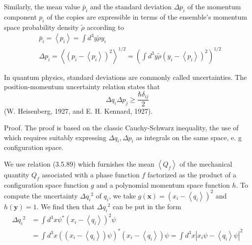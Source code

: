 \documentclass{article}
\begin{document}
Similarly, the mean value $\bar{p}_{i}$ and the standard deviation $\Delta p_{i}$ of the momentum component $p_{i}$ of the copies are expressible in terms of the ensemble's momentum space probability density $\tilde{\rho}$ according to
$$
\begin{align*}
& \bar{p}_{i}=\left\langle p_{i}\right\rangle=\int d^{3} y \tilde{\rho} y_{i}  \tag{3.10.3}\\
& \Delta p_{i}=\left\langle\left(p_{i}-\left\langle p_{i}\right\rangle\right)^{2}\right\rangle^{1 / 2}=\left(\int d^{3} y \tilde{\rho}\left(y_{i}-\left\langle p_{i}\right\rangle\right)^{2}\right)^{1 / 2} \tag{3.10.4}
\end{align*}
$$

In quantum physics, standard deviations are commonly called uncertainties. The position-momentum uncertainty relation states that
$$
\begin{equation*}
\Delta q_{i} \Delta p_{j} \geq \frac{\hbar \delta_{i j}}{2} \tag{3.10.5}
\end{equation*}
$$
(W. Heisenberg, 1927, and E. H. Kennard, 1927).

Proof. The proof is based on the classic Cauchy-Schwarz inequality, the use of which requires suitably expressing $\Delta q_{i}, \Delta p_{i}$ as integrals on the same space, e. g configuration space.

We use relation (3.5.89) which furnishes the mean $\left\langle Q_{f}\right\rangle$ of the mechanical quantity $Q_{f}$ associated with a phase function $f$ factorized as the product of a configuration space function $g$ and a polynomial momentum space function $h$. To compute the uncertainty $\Delta q_{i}{ }^{2}$ of $q_{i}$, we take $g(\boldsymbol{x})=\left(x_{i}-\left\langle q_{i}\right\rangle\right)^{2}$ and $h(\boldsymbol{y})=1$. We find then that $\Delta q_{i}{ }^{2}$ can be put in the form
$$
\begin{align*}
\Delta q_{i}{ }^{2} & =\int d^{3} x \psi^{*}\left(x_{i}-\left\langle q_{i}\right\rangle\right)^{2} \psi  \tag{3.10.6}\\
& =\int d^{3} x\left(\left(x_{i}-\left\langle q_{i}\right\rangle\right) \psi\right)^{*}\left(x_{i}-\left\langle q_{i}\right\rangle\right) \psi=\int d^{3} x\left|x_{i} \psi-\left\langle q_{i}\right\rangle \psi\right|^{2}
\end{align*}
$$
\end{document}
